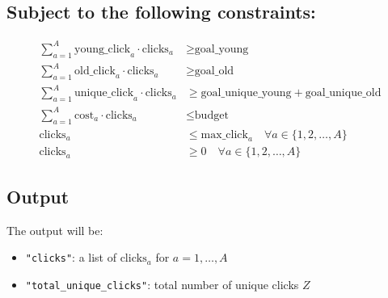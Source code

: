 \documentclass{article}
\begin{document}
\subsection*{Subject to the following constraints:}
\begin{align}
    \sum_{a=1}^{A} \text{young\_click}_a \cdot \text{clicks}_a & \geq \text{goal\_young} \\
    \sum_{a=1}^{A} \text{old\_click}_a \cdot \text{clicks}_a & \geq \text{goal\_old} \\
    \sum_{a=1}^{A} \text{unique\_click}_a \cdot \text{clicks}_a & \geq \text{goal\_unique\_young} + \text{goal\_unique\_old} \\
    \sum_{a=1}^{A} \text{cost}_a \cdot \text{clicks}_a & \leq \text{budget} \\
    \text{clicks}_a & \leq \text{max\_click}_a \quad \forall a \in \{1, 2, \ldots, A\} \\
    \text{clicks}_a & \geq 0 \quad \forall a \in \{1, 2, \ldots, A\} 
\end{align}

\subsection*{Output}
The output will be:
\begin{itemize}
    \item \texttt{"clicks"}: a list of \( \text{clicks}_a \) for \( a = 1, \ldots, A \)
    \item \texttt{"total\_unique\_clicks"}: total number of unique clicks \( Z \)
\end{itemize}
\end{document}
